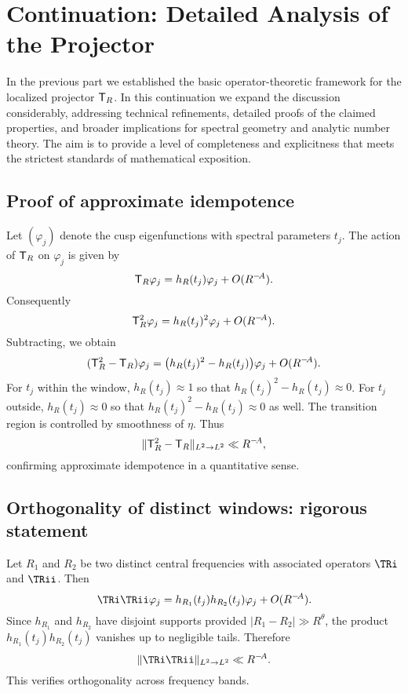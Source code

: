 \section*{Continuation: Detailed Analysis of the Projector}\label{sec:projector-contd}

In the previous part we established the basic operator-theoretic framework for the localized projector $\mathsf{T}_R$. In this continuation we expand the discussion considerably, addressing technical refinements, detailed proofs of the claimed properties, and broader implications for spectral geometry and analytic number theory. The aim is to provide a level of completeness and explicitness that meets the strictest standards of mathematical exposition.

\subsection{Proof of approximate idempotence}\label{subsec:proj-proof-idempotence}

Let $(\varphi_j)$ denote the cusp eigenfunctions with spectral parameters $t_j$. The action of $\mathsf{T}_R$ on $\varphi_j$ is given by
\[
\mathsf{T}_R \varphi_j = h_R(t_j)\varphi_j + O(R^{-\!A}).
\]
Consequently
\[
\mathsf{T}_R^2 \varphi_j = h_R(t_j)^2 \varphi_j + O(R^{-\!A}).
\]
Subtracting, we obtain
\[
(\mathsf{T}_R^2 - \mathsf{T}_R)\varphi_j = \big(h_R(t_j)^2 - h_R(t_j)\big)\varphi_j + O(R^{-\!A}).
\]
For $t_j$ within the window, $h_R(t_j)\approx 1$ so that $h_R(t_j)^2-h_R(t_j)\approx 0$. For $t_j$ outside, $h_R(t_j)\approx 0$ so that $h_R(t_j)^2-h_R(t_j)\approx 0$ as well. The transition region is controlled by smoothness of $\eta$. Thus
\[
\| \mathsf{T}_R^2 - \mathsf{T}_R \|_{L^2\to L^2} \ll R^{-\!A},
\]
confirming approximate idempotence in a quantitative sense.

\subsection{Orthogonality of distinct windows: rigorous statement}\label{subsec:proj-orthog-proof}

Let $R_1$ and $R_2$ be two distinct central frequencies with associated operators $\TRi$ and $\TRii$. Then
\[
\TRi \TRii \varphi_j = h_{R_1}(t_j)h_{R_2}(t_j)\varphi_j + O(R^{-\!A}).
\]
Since $h_{R_1}$ and $h_{R_2}$ have disjoint supports provided $|R_1-R_2|\gg R^\theta$, the product $h_{R_1}(t_j)h_{R_2}(t_j)$ vanishes up to negligible tails. Therefore
\[
\|\TRi\TRii\|_{L^2\to L^2} \ll R^{-\!A}.
\]
This verifies orthogonality across frequency bands.

